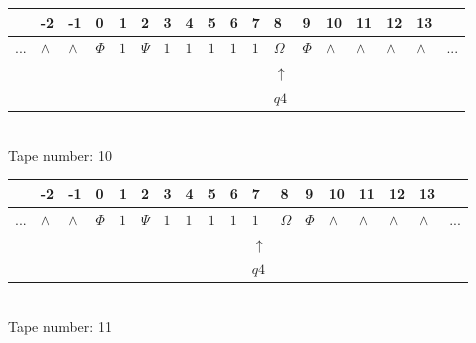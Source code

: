 \documentclass[11pt]{article}
\begin{document}
\begin{table}[H]
\centering
\begin{tabular}{llllllllllllllllll}
 & -2 & -1 & 0 & 1 & 2 & 3 & 4 & 5 & 6 & 7 & 8 & 9 & 10 & 11 & 12 & 13 & \\
\hline
$...$ & \multicolumn{1}{|l|}{$\wedge$} & \multicolumn{1}{|l|}{$\wedge$} & \multicolumn{1}{|l|}{$\Phi$} & \multicolumn{1}{|l|}{$1$} & \multicolumn{1}{|l|}{$\Psi$} & \multicolumn{1}{|l|}{$1$} & \multicolumn{1}{|l|}{$1$} & \multicolumn{1}{|l|}{$1$} & \multicolumn{1}{|l|}{$1$} & \multicolumn{1}{|l|}{$1$} & \multicolumn{1}{|l|}{$\Omega$} & \multicolumn{1}{|l|}{$\Phi$} & \multicolumn{1}{|l|}{$\wedge$} & \multicolumn{1}{|l|}{$\wedge$} & \multicolumn{1}{|l|}{$\wedge$} & \multicolumn{1}{|l|}{$\wedge$} & $...$\\
\hline
&  &  &  &  &  &  &  &  &  &  & $\uparrow$ &  &  &  &  &  &  \\
&  &  &  &  &  &  &  &  &  &  & $ q4 $ &  &  &  &  &  &  \\
\end{tabular}
\\
Tape number: 10
\noindent\makebox[\linewidth]{\hdashrule{\textwidth}{1pt}{1pt}}\end{table}

\begin{table}[H]
\centering
\begin{tabular}{llllllllllllllllll}
 & -2 & -1 & 0 & 1 & 2 & 3 & 4 & 5 & 6 & 7 & 8 & 9 & 10 & 11 & 12 & 13 & \\
\hline
$...$ & \multicolumn{1}{|l|}{$\wedge$} & \multicolumn{1}{|l|}{$\wedge$} & \multicolumn{1}{|l|}{$\Phi$} & \multicolumn{1}{|l|}{$1$} & \multicolumn{1}{|l|}{$\Psi$} & \multicolumn{1}{|l|}{$1$} & \multicolumn{1}{|l|}{$1$} & \multicolumn{1}{|l|}{$1$} & \multicolumn{1}{|l|}{$1$} & \multicolumn{1}{|l|}{$1$} & \multicolumn{1}{|l|}{$\Omega$} & \multicolumn{1}{|l|}{$\Phi$} & \multicolumn{1}{|l|}{$\wedge$} & \multicolumn{1}{|l|}{$\wedge$} & \multicolumn{1}{|l|}{$\wedge$} & \multicolumn{1}{|l|}{$\wedge$} & $...$\\
\hline
&  &  &  &  &  &  &  &  &  & $\uparrow$ &  &  &  &  &  &  &  \\
&  &  &  &  &  &  &  &  &  & $ q4 $ &  &  &  &  &  &  &  \\
\end{tabular}
\\
Tape number: 11
\noindent\makebox[\linewidth]{\hdashrule{\textwidth}{1pt}{1pt}}\end{table}
\clearpage
\end{document}
